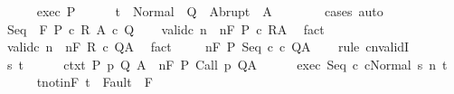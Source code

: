 \begin{isabellebody}
\ \ \ \ \isamarkupfalse%
\ exec\ P\isanewline
\ \ \ \ \isamarkupfalse%
\ {\isachardoublequoteopen}t\ {\isasymin}\ Normal\ {\isacharbackquote}\ Q\ {\isasymunion}\ Abrupt\ {\isacharbackquote}\ A{\isachardoublequoteclose}\isanewline
\ \ \ \ \ \ \isamarkupfalse%
\ cases\ auto\isanewline
\ \ \isamarkupfalse%
\isanewline
{}\isamarkupfalse%
\isanewline
\ \ \isamarkupfalse%
\ {\isacharparenleft}Seq\ {\isasymTheta}\ F\ P\ c{}\ R\ A\ c{}\ Q{\isacharparenright}\isanewline
\ \ \isamarkupfalse%
\ valid{\isacharunderscore}c{}{\isacharcolon}\ {\isachardoublequoteopen}{\isasymAnd}n{\isachardot}\ {\isasymGamma}{\isacharcomma}{\isasymTheta}\ {\isasymTurnstile}n{\isacharcolon}\isactrlbsub {\isacharslash}F\isactrlesub \ P\ c{}\ R{\isacharcomma}A{\isachardoublequoteclose}\ \isamarkupfalse%
\ fact\isanewline
\ \ \isamarkupfalse%
\ valid{\isacharunderscore}c{}{\isacharcolon}\ {\isachardoublequoteopen}{\isasymAnd}n{\isachardot}\ {\isasymGamma}{\isacharcomma}{\isasymTheta}\ {\isasymTurnstile}n{\isacharcolon}\isactrlbsub {\isacharslash}F\isactrlesub \ R\ c{}\ Q{\isacharcomma}A{\isachardoublequoteclose}\ \isamarkupfalse%
\ fact\isanewline
\ \ \isamarkupfalse%
\ {\isachardoublequoteopen}{\isasymGamma}{\isacharcomma}{\isasymTheta}\ {\isasymTurnstile}n{\isacharcolon}\isactrlbsub {\isacharslash}F\isactrlesub \ P\ Seq\ c{}\ c{}\ Q{\isacharcomma}A{\isachardoublequoteclose}\isanewline
\ \ \isamarkupfalse%
\ {\isacharparenleft}rule\ cnvalidI{\isacharparenright}\isanewline
\ \ \ \ \isamarkupfalse%
\ s\ t\isanewline
\ \ \ \ \isamarkupfalse%
\ ctxt{\isacharcolon}\ {\isachardoublequoteopen}{\isasymforall}{\isacharparenleft}P{\isacharcomma}\ p{\isacharcomma}\ Q{\isacharcomma}\ A{\isacharparenright}{\isasymin}{\isasymTheta}{\isachardot}\ {\isasymGamma}\ {\isasymTurnstile}n{\isacharcolon}\isactrlbsub {\isacharslash}F\isactrlesub \ P\ {\isacharparenleft}Call\ p{\isacharparenright}\ Q{\isacharcomma}A{\isachardoublequoteclose}\isanewline
\ \ \ \ \isamarkupfalse%
\ exec{\isacharcolon}\ {\isachardoublequoteopen}{\isasymGamma}{\isasymturnstile}{\isasymlangle}Seq\ c{}\ c{}{\isacharcomma}Normal\ s{\isasymrangle}\ {\isacharequal}n{\isasymRightarrow}\ t{\isachardoublequoteclose}\isanewline
\ \ \ \ \isamarkupfalse%
\ t{\isacharunderscore}notin{\isacharunderscore}F{\isacharcolon}\ {\isachardoublequoteopen}t\ {\isasymnotin}\ Fault\ {\isacharbackquote}\ F{\isachardoublequoteclose}\ \isanewline

\end{isabellebody}
